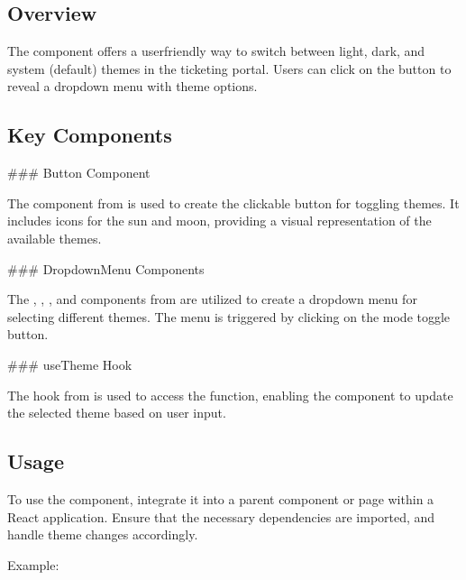 \documentclass[letterpaper,10pt,english]{sphinxmanual}
\begin{document}
\subsection{Overview}
\label{\detokenize{forms/toggle:overview}}
\sphinxAtStartPar
The  component offers a user\sphinxhyphen{}friendly way to switch between light, dark, and system (default) themes in the ticketing portal. Users can click on the button to reveal a dropdown menu with theme options.


\subsection{Key Components}
\label{\detokenize{forms/toggle:key-components}}
\sphinxAtStartPar
\#\#\# Button Component

\sphinxAtStartPar
The  component from  is used to create the clickable button for toggling themes. It includes icons for the sun and moon, providing a visual representation of the available themes.

\sphinxAtStartPar
\#\#\# DropdownMenu Components

\sphinxAtStartPar
The , , , and  components from  are utilized to create a dropdown menu for selecting different themes. The menu is triggered by clicking on the mode toggle button.

\sphinxAtStartPar
\#\#\# useTheme Hook

\sphinxAtStartPar
The  hook from  is used to access the  function, enabling the component to update the selected theme based on user input.


\subsection{Usage}
\label{\detokenize{forms/toggle:usage}}
\sphinxAtStartPar
To use the  component, integrate it into a parent component or page within a React application. Ensure that the necessary dependencies are imported, and handle theme changes accordingly.

\sphinxAtStartPar
Example:
\end{document}

